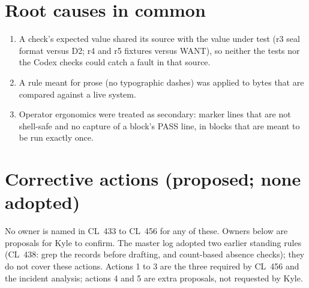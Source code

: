 \documentclass[10pt]{article}
\newcommand{\CL}[1]{CL~#1}
\begin{document}
\section{Root causes in common}

\begin{enumerate}[leftmargin=1.5em,itemsep=0.1em]
\item A check's expected value shared its source with the value under test (r3 seal format versus D2; r4 and r5 fixtures versus WANT), so neither the tests nor the Codex checks could catch a fault in that source.
\item A rule meant for prose (no typographic dashes) was applied to bytes that are compared against a live system.
\item Operator ergonomics were treated as secondary: marker lines that are not shell-safe and no capture of a block's PASS line, in blocks that are meant to be run exactly once.
\end{enumerate}

\section{Corrective actions (proposed; none adopted)}

No owner is named in \CL{433} to \CL{456} for any of these. Owners below are proposals for Kyle to confirm. The master log adopted two earlier standing rules (\CL{438}: grep the records before drafting, and count-based absence checks); they do not cover these actions. Actions 1 to 3 are the three required by \CL{456} and the incident analysis; actions 4 and 5 are extra proposals, not requested by Kyle.
\end{document}
